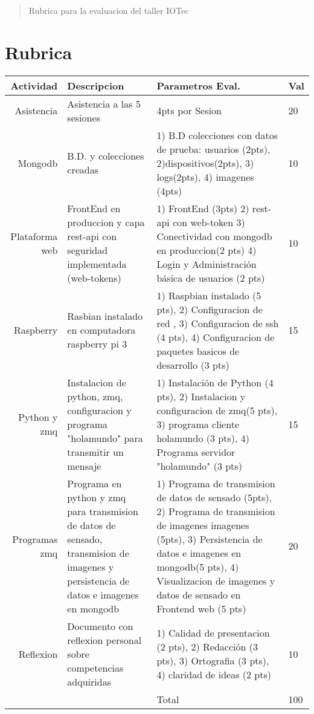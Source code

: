 \documentclass[12pt]{article}
\begin{document}
\maketitle

\begin{abstract}
Rubrica para la evaluacion del taller IOTec
\end{abstract}

\section{Rubrica}


\begin{tabularx}{\linewidth}{ r | X | X | l}
\hline
Actividad&Descripcion&Parametros Eval.&Val\\
\hline

\hline
Asistencia&Asistencia a las 5 sesiones & 4pts por Sesion &20\\ 
\hline

Mongodb
& B.D. y colecciones creadas 
& 1) B.D colecciones con datos de prueba:  usuarios (2pts), 2)dispositivos(2pts), 3) logs(2pts), 4) imagenes (4pts)
&10\\ 

\hline

Plataforma web& FrontEnd en produccion y capa rest-api con seguridad implementada (web-tokens) & 
1) FrontEnd (3pts)  2) rest-api con web-token 3) Conectividad con mongodb en produccion(2 pts)
4) Login y Administración básica de usuarios (2 pts) &10\\ 

\hline

Raspberry&Rasbian instalado en computadora raspberry pi 3& 1) Raspbian instalado (5 pts), 2) Configuracion de red , 3) Configuracion de ssh (4 pts), 4) Configuracion de paquetes basicos de desarrollo (3 pts) &15\\ \hline

Python y zmq&Instalacion de python, zmq, configuracion y programa "holamundo" para transmitir un mensaje& 
1) Instalación de Python (4 pts), 2) Instalacion y configuracion de zmq(5 pts), 3) programa cliente holamundo (3 pts), 4) Programa servidor "holamundo" (3 pts)
 &15\\ \hline

Programas zmq&Programa en python y zmq para transmision de datos de sensado, transmision de imagenes y persistencia de datos e imagenes en mongodb & 
1) Programa de transmision de datos de sensado (5pts), 
2) Programa de transmision de imagenes imagenes (5pts), 
3) Persistencia de datos e imagenes en mongodb(5 pts),
4) Visualizacion de imagenes y datos de sensado en Frontend web (5 pts) 
&20\\ \hline


Reflexion  & Documento con reflexion personal sobre competencias adquiridas & 1) Calidad de presentacion (2 pts), 2) Redacción (3 pts), 3) Ortografia (3 pts), 4) claridad de ideas (2 pts) &10\\ \hline


&&Total&100\\ \hline

\hline


\end{tabularx}
\end{document}
